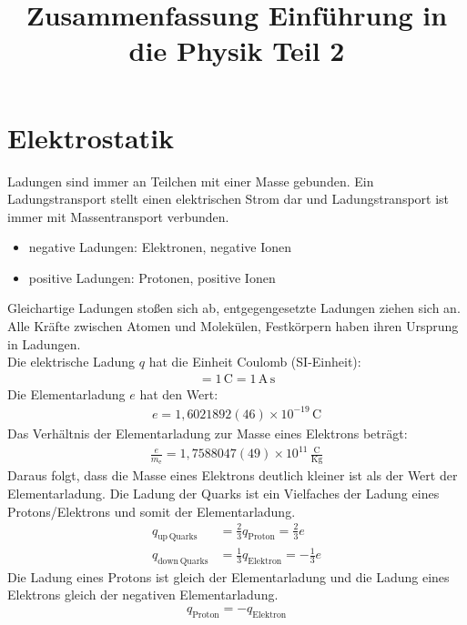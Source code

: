 \documentclass{article}
\title{Zusammenfassung Einführung in die Physik Teil 2}
\begin{document}
\maketitle
\tableofcontents
\newpage



\section{Elektrostatik}
Ladungen sind immer an Teilchen mit einer Masse gebunden. Ein Ladungstransport stellt einen elektrischen Strom dar und Ladungstransport
ist immer mit Massentransport verbunden.
\begin{itemize}
\item negative Ladungen: Elektronen, negative Ionen 
\item positive Ladungen: Protonen, positive Ionen
\end{itemize}
Gleichartige Ladungen stoßen sich ab, entgegengesetzte Ladungen ziehen sich an. Alle Kräfte zwischen Atomen und Molekülen,
Festkörpern haben ihren Ursprung in Ladungen.\\

Die elektrische Ladung $q$ hat die Einheit Coulomb (SI-Einheit):
\begin{align}
    [q]=1\,\mathrm{C}=1\,\mathrm{A\,s}
\end{align}
Die Elementarladung $e$ hat den Wert:
\begin{align}
    e=1,6021892(46)\times 10^{-19}\,\mathrm{C}
\end{align}
Das Verhältnis der Elementarladung zur Masse eines Elektrons beträgt:
\begin{align}
    \frac{e}{m_\mathrm{e}}=1,7588047(49)\times 10^{11}\,\frac{\mathrm{C}}{\mathrm{Kg}}
\end{align}
Daraus folgt, dass die Masse eines Elektrons deutlich kleiner ist als der Wert der Elementarladung.
Die Ladung der Quarks ist ein Vielfaches der Ladung eines Protons/Elektrons und somit der Elementarladung.
\begin{align}
    q_\mathrm{up\, Quarks}&=\frac{2}{3}q_\mathrm{Proton}=\frac{2}{3}e\\
    q_\mathrm{down\, Quarks}&=\frac{1}{3}q_\mathrm{Elektron}=-\frac{1}{3}e
\end{align}
Die Ladung eines Protons ist gleich der Elementarladung und die Ladung eines Elektrons gleich der negativen Elementarladung.
\begin{align}
    q_\mathrm{Proton}=-q_\mathrm{Elektron}
\end{align}
\end{document}
